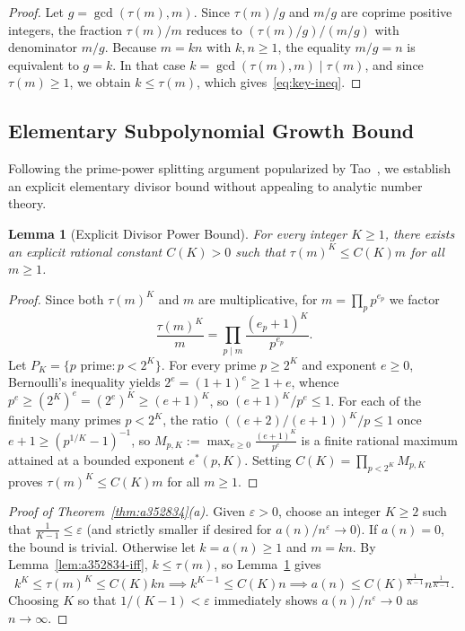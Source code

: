 \documentclass[11pt,a4paper]{article}
\newtheorem{lemma}[theorem]{Lemma}
\theoremstyle{definition}
\theoremstyle{remark}
\begin{document}
\begin{proof}
Let $g = \gcd(\tau(m), m)$. Since $\tau(m)/g$ and $m/g$ are coprime positive integers, the fraction $\tau(m)/m$ reduces to $(\tau(m)/g)/(m/g)$ with denominator $m/g$. Because $m = kn$ with $k,n \ge 1$, the equality $m/g = n$ is equivalent to $g = k$. In that case $k = \gcd(\tau(m), m) \mid \tau(m)$, and since $\tau(m) \ge 1$, we obtain $k \le \tau(m)$, which gives~\eqref{eq:key-ineq}.
\end{proof}

\subsection{Elementary Subpolynomial Growth Bound}

Following the prime-power splitting argument popularized by Tao~\cite{tao-divisor}, we establish an explicit elementary divisor bound without appealing to analytic number theory.

\begin{lemma}[Explicit Divisor Power Bound]\label{lem:divisor-bound}
For every integer $K \ge 1$, there exists an explicit rational constant $C(K) > 0$ such that $\tau(m)^K \le C(K) m$ for all $m \ge 1$.
\end{lemma}

\begin{proof}
Since both $\tau(m)^K$ and $m$ are multiplicative, for $m = \prod_{p} p^{e_p}$ we factor
\[
  \frac{\tau(m)^K}{m} = \prod_{p \mid m} \frac{(e_p + 1)^K}{p^{e_p}}.
\]
Let $P_K = \{p \text{ prime} : p < 2^K\}$. For every prime $p \ge 2^K$ and exponent $e \ge 0$, Bernoulli's inequality yields $2^e = (1+1)^e \ge 1 + e$, whence $p^e \ge (2^K)^e = (2^e)^K \ge (e+1)^K$, so $(e+1)^K / p^e \le 1$. For each of the finitely many primes $p < 2^K$, the ratio $((e+2)/(e+1))^K / p \le 1$ once $e+1 \ge (p^{1/K} - 1)^{-1}$, so $M_{p,K} := \max_{e \ge 0} \frac{(e+1)^K}{p^e}$ is a finite rational maximum attained at a bounded exponent $e^*(p,K)$. Setting $C(K) = \prod_{p < 2^K} M_{p,K}$ proves $\tau(m)^K \le C(K) m$ for all $m \ge 1$.
\end{proof}

\begin{proof}[Proof of Theorem~\ref{thm:a352834}(a)]
Given $\varepsilon > 0$, choose an integer $K \ge 2$ such that $\frac{1}{K-1} \le \varepsilon$ (and strictly smaller if desired for $a(n)/n^\varepsilon \to 0$). If $a(n) = 0$, the bound is trivial. Otherwise let $k = a(n) \ge 1$ and $m = kn$. By Lemma~\ref{lem:a352834-iff}, $k \le \tau(m)$, so Lemma~\ref{lem:divisor-bound} gives
\[
  k^K \le \tau(m)^K \le C(K) k n \implies k^{K-1} \le C(K) n \implies a(n) \le C(K)^{\frac{1}{K-1}} n^{\frac{1}{K-1}}.
\]
Choosing $K$ so that $1/(K-1) < \varepsilon$ immediately shows $a(n)/n^\varepsilon \to 0$ as $n \to \infty$.
\end{proof}
\end{document}

